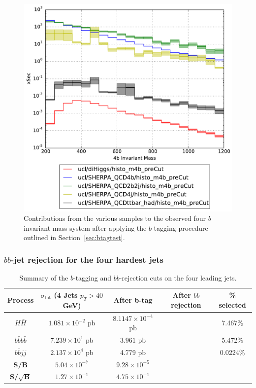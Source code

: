 \documentclass[12pt]{article}
\begin{document}
\begin{figure}[h!]
\begin{center}
\includegraphics[width=\textwidth]{plots/m4b_ucl_preCut.pdf}
\caption{Contributions from the various samples to the observed four $b$ invariant mass system after applying the $b$-tagging procedure outlined in Section~\ref{sec:btagtest}.}
\end{center}
\end{figure}


\subsubsection{$bb$-jet rejection for the four hardest jets}

\begin{table}[h]
\begin{center}
\begin{tabular}{|c|c|c|c|c|}
\hline
Process & $\sigma_{\mathrm{tot}}$ (4 Jets $p_T>40$ GeV) & After b-tag & After $bb$ rejection & \% selected  \\
\hline \hline
$H\bar{H}$ & $1.081 \times 10^{-2}$ pb & $8.1147\times 10^{-4}$ pb & & 7.467\% \\
\hline
$b\bar{b}b\bar{b}$ & $7.239 \times10^1$ pb & $3.961$ pb & & 5.472\% \\
$b\bar{b}jj$ &  $2.137 \times 10^4$ pb & 4.779 pb & & 0.0224\% \\
\hline
\textbf{S/B} & $5.04 \times 10^{-7}$ & $9.28 \times 10^{-5}$& & \multicolumn{1}{c}{}\\
\cline{1-3}
\textbf{S/$\sqrt{\mathrm{\textbf{B}}}$}& $1.27 \times 10^{-1}$ & $4.75 \times 10^{-1}$& & \multicolumn{1}{c}{}\\
\cline{1-3}
\end{tabular}
\end{center}
\caption{Summary of the $b$-tagging and $bb$-rejection cuts on the four leading jets.}\label{tab:TestbbTag}
\end{table}%
\end{document}
